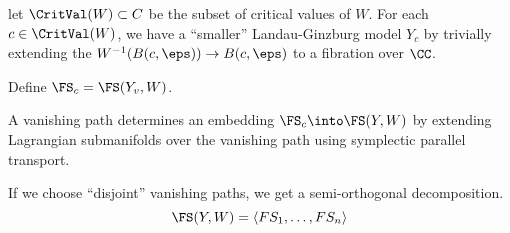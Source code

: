 

let $\CritVal(W)\subset C$ be the subset of critical values of $W$. For each $c\in \CritVal(W)$, we have a ``smaller'' Landau-Ginzburg model $Y_c$ by trivially extending the $W^{-1}(B(c, \eps))\to B(c, \eps)$ to a fibration over $\CC$. 

Define $\FS_c=\FS(Y_v, W)$. 

A vanishing path determines an embedding $\FS_c\into \FS(Y, W)$ by extending Lagrangian submanifolds over the vanishing path using symplectic parallel transport. 

If we choose ``disjoint'' vanishing paths, we get a semi-orthogonal decomposition.
\[\FS(Y, W) = \langle FS_1, \ldots, FS_n\rangle \]



